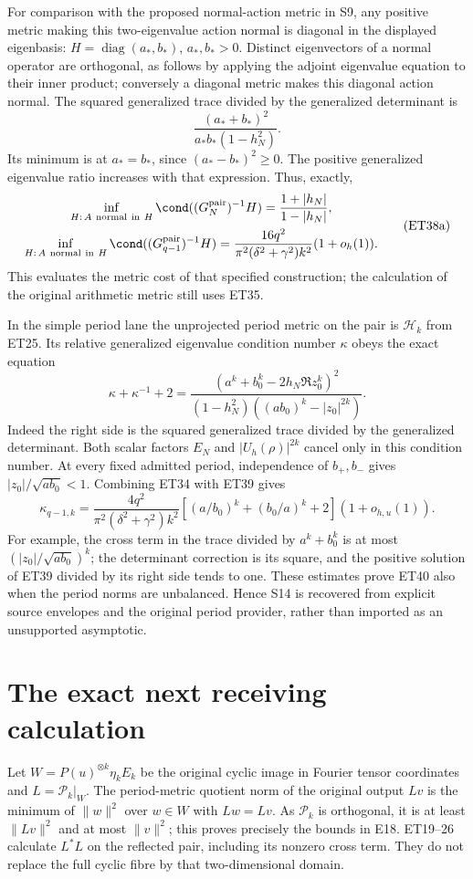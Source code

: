 For comparison with the proposed normal-action metric in S9, any
positive metric making this two-eigenvalue action normal is diagonal
in the displayed eigenbasis: \(H=\operatorname{diag}(a_*,b_*)\),
\(a_*,b_*>0\). Distinct eigenvectors of a normal operator are
orthogonal, as follows by applying the adjoint eigenvalue equation
to their inner product; conversely a diagonal metric makes this
diagonal action normal. The squared generalized trace divided by
the generalized determinant is
\[
 \frac{(a_*+b_*)^2}{a_*b_*(1-h_N^2)}.
\]
Its minimum is at \(a_*=b_*\), since
\((a_*-b_*)^2\ge0\). The positive generalized eigenvalue ratio
increases with that expression. Thus, exactly,
\[
\begin{gathered}\inf_{H:\,A\ {\rm normal\ in}\ H}
 \cond((G_N^{\rm pair})^{-1}H)
   =\frac{1+|h_N|}{1-|h_N|},\\
 \inf_{H:\,A\ {\rm normal\ in}\ H}
 \cond((G_{q-1}^{\rm pair})^{-1}H)
 =\frac{16q^2}{\pi^2(\delta^2+\gamma^2)k^2}
                                             (1+o_h(1)).\end{gathered} \tag{ET38a}
\]
This evaluates the metric cost of that specified construction; the
calculation of the original arithmetic metric still uses ET35.

In the simple period lane the unprojected period metric on the pair
is \(\mathcal H_k\) from ET25. Its relative generalized eigenvalue
condition number \(\kappa\) obeys the exact equation
\[
 \kappa+\kappa^{-1}+2=
 \frac{(a^k+b_0^k-2h_N\Re z_0^k)^2}
 {(1-h_N^2)((ab_0)^k-|z_0|^{2k})}.                  \tag{ET39}
\]
Indeed the right side is the squared generalized trace divided by
the generalized determinant. Both scalar factors
\(E_N\) and \(|U_h(\rho)|^{2k}\) cancel only in this condition number.
At every fixed admitted period, independence of \(b_+,b_-\) gives
\(|z_0|/\sqrt{ab_0}<1\). Combining ET34 with ET39 gives
\[
 \kappa_{q-1,k}=
 \frac{4q^2}{\pi^2(\delta^2+\gamma^2)k^2}
 \left[(a/b_0)^k+(b_0/a)^k+2\right](1+o_{h,u}(1)).
                                                               \tag{ET40}
\]
For example, the cross term in the trace divided by
\(a^k+b_0^k\) is at most
\((|z_0|/\sqrt{ab_0})^k\); the determinant correction is its
square, and the positive solution of ET39 divided by its right
side tends to one. These estimates prove ET40 also when the period
norms are unbalanced. Hence S14 is recovered from explicit source
envelopes and the original period provider, rather than imported
as an unsupported asymptotic.

\section{The exact next receiving calculation}
Let \(W=P(u)^{\otimes k}\eta_kE_k\) be the original cyclic image
in Fourier tensor coordinates and \(L=\mathcal P_k|_W\).
The period-metric quotient norm of the original output \(Lv\) is
the minimum of \(\|w\|^2\) over \(w\in W\) with \(Lw=Lv\).
As \(\mathcal P_k\) is orthogonal, it is at least \(\|Lv\|^2\)
and at most \(\|v\|^2\); this proves precisely the bounds in E18.
ET19--26 calculate \(L^*L\) on the reflected pair, including its
nonzero cross term. They do not replace the full cyclic fibre by
that two-dimensional domain.

